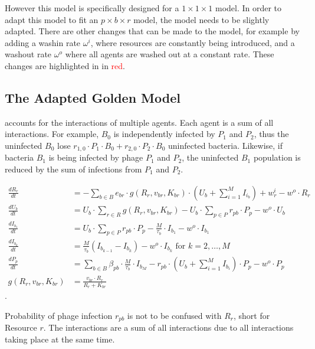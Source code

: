 However this model is specifically designed for a $1\times 1 \times 1$ model. 
In order to adapt this model to fit an $p \times b \times r$ model, the model needs to be slightly adapted. 
There are other changes that can be made to the model, for example by adding a washin rate $\omega^{i}$, where resources are constantly being introduced, and a washout rate $\omega^{o}$ where all agents are washed out at a constant rate. 
These changes are highlighted in  in \textcolor{red}{red}. 

\subsection{The Adapted Golden Model}
\label{sec:adapted_golden_model}
 accounts for the interactions of multiple agents. 
Each agent is a sum of all interactions. 
For example, $B_0$ is independently infected by $P_1$ and $P_2$, thus the uninfected $B_0$ lose $r_{1, 0} \cdot P_1 \cdot B_0 + r_{2, 0} \cdot P_2 \cdot B_0$ uninfected bacteria. 
Likewise, if bacteria $B_1$ is being infected by phage $P_1$ and $P_2$, the uninfected $B_1$ population is reduced by the sum of infections from $P_1$ and $P_2$. 
\begin{eqfloat}
    \begin{align}
        \frac{dR_r}{dt} &= -\sum_{b \in B} e_{b r} \cdot g(R_r, v_{b r}, K_{b r})\cdot (U_b + \sum_{i=1}^{M} I_{i_b}) + w^i_r - w^o \cdot R_r\\
        \frac{dU_b}{dt} &= U_b \cdot \sum_{r \in R} g(R_r, v_{b r}, K_{b r}) - U_b \cdot \sum_{p \in P} r_{p b} \cdot P_p - w^o \cdot U_b\\
        \frac{dI_{b_1}}{dt} &= U_b \cdot \sum_{p \in P}r_{p b} \cdot P_p - \frac{M}{\tau_b}\cdot I_{b_1} - w^o \cdot I_{b_1}\\
        \frac{dI_{b_k}}{dt} &= \frac{M}{\tau_b}(I_{b_{k-1}}-I_{b_k}) - w^o \cdot I_{b_k}\text{ for } k=2, \dots, M \\
        \frac{dP_p}{dt} &= \sum_{b\in B}\beta_{p b}\cdot\frac{M}{\tau_b} \cdot I_{b_M} - r_{p b}\cdot(U_b + \sum_{i=1}^{M} I_{b_i})\cdot P_p - w^o \cdot P_p\\
        g(R_r, v_{b r}, K_{b r}) &= \frac{v_{b r} \cdot R_r}{R_r + K_{b r}}
        \label{eq:adapted_golden_model}
    \end{align}. 
    \caption{
        Probability of phage infection $r_{p b}$ is not to be confused with $R_r$, short for Resource $r$. 
        The interactions are a sum of all interactions due to all interactions taking place at the same time. 
    }
\end{eqfloat}

